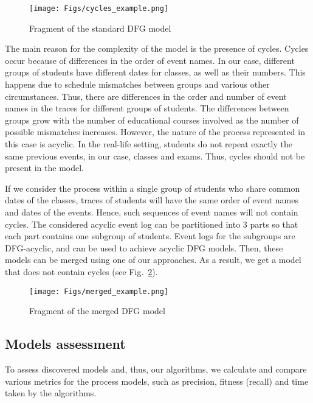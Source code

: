\documentclass[11pt]{article}
\theoremstyle{definition}
\begin{document}
\begin{figure}[htb]
    \centering
    \texttt{[image: Figs/cycles\_example.png]}
    \caption{Fragment of the standard DFG model}
    \label{fig:cycles_example}
\end{figure}

The main reason for the complexity of the model is the presence of cycles. Cycles occur because of differences in the order of event names. In our case, different groups of students have different dates for classes, as well as their numbers. This happens due to schedule mismatches between groups and various other circumstances. Thus, there are differences in the order and number of event names in the traces for different groups of students. 
The differences between groups grow with the number of educational courses involved as the number of possible mismatches increases. However, the nature of the process represented in this case is acyclic. 
In the real-life setting, students do not repeat exactly the same previous events, in our case, classes and exams. 
Thus, cycles should not be present in the model. 

If we consider the process within a single group of students who share common dates of the classes, traces of students will have the same order of event names and dates of the events. Hence, such sequences of event names will not contain cycles. The considered acyclic event log can be partitioned into 3 parts so that each part contains one subgroup of students. Event logs for the subgroups are DFG-acyclic, and can be used to achieve acyclic DFG models. 
Then, these models can be merged using one of our approaches. 
As a result, we get a model that does not contain cycles (see Fig.~\ref{fig:merged_example}).

\begin{figure}[htb]
    \centering
    \texttt{[image: Figs/merged\_example.png]}
    \caption{Fragment of the merged DFG model}
    \label{fig:merged_example}
\end{figure}

\subsection{Models assessment}\label{sec:models_assessment}

To assess discovered models and, thus, our algorithms, we calculate and compare various metrics for the process models, such as precision, fitness (recall) and time taken by the algorithms. 
\end{document}

